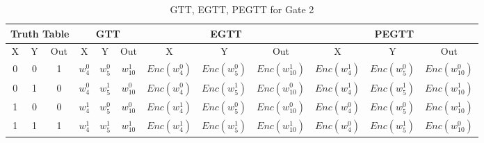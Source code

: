 \documentclass[times]{article}
\begin{document}
	\begin{table}
		\centering
		\caption{GTT, EGTT, PEGTT for Gate 2}
		\label{tab:gtt2}
		\begin{adjustbox}{width=1\textwidth}
		\begin{tabular}{|c|c|c||c|c|c||c|c|c||c|c|c|}
			\hline
			\multicolumn{3}{|c||}{Truth Table} 		& 
				\multicolumn{3}{|c||}{GTT}			& 
					\multicolumn{3}{|c||}{EGTT} 		& 
						\multicolumn{3}{|c|}{PEGTT} \\
			\hline
			\hline
			X & Y & Out	& 
				X & Y & Out	& 
					X & Y & Out	& 
						X & Y & Out	\\
			\hline
			0 & 0 & 1 	&
				$w_{4}^0$	& $w_{5}^0$	& $w_{10}^1$	& 
					$Enc(w_{4}^0)$	& $Enc(w_{5}^0)$	& $Enc(w_{10}^1)$ &
						$Enc(w_{4}^1)$	& $Enc(w_{5}^0)$	& $Enc(w_{10}^0)$ \\
			\hline
			0 & 1 & 0 	&
				$w_{4}^0$	& $w_{5}^1$	& $w_{10}^0$	& 
					$Enc(w_{4}^0)$	& $Enc(w_{5}^1)$	& $Enc(w_{10}^0)$ &
						$Enc(w_{4}^1)$	& $Enc(w_{5}^1)$	& $Enc(w_{10}^1)$ \\
			\hline
			1 & 0 & 0 	&
				$w_{4}^1$	& $w_{5}^0$	& $w_{10}^0$	& 
					$Enc(w_{4}^1)$	& $Enc(w_{5}^0)$	& $Enc(w_{10}^0)$ &
						$Enc(w_{4}^0)$	& $Enc(w_{5}^0)$	& $Enc(w_{10}^1)$ \\
			\hline
			1 & 1 & 1 	&
				$w_{4}^1$	& $w_{5}^1$	& $w_{10}^1$	& 
					$Enc(w_{4}^1)$	& $Enc(w_{5}^1)$	& $Enc(w_{10}^1)$ &
						$Enc(w_{4}^0)$	& $Enc(w_{5}^1)$	& $Enc(w_{10}^0)$ \\
			\hline
		\end{tabular}
		\end{adjustbox}
	\end{table}
\end{document}
